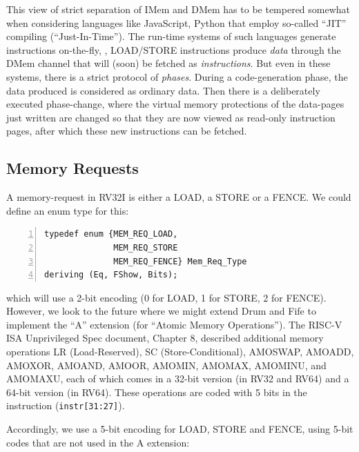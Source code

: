 
This view of strict separation of IMem and DMem has to be tempered
somewhat when considering languages like JavaScript, Python {\etc}
that employ so-called ``JIT'' compiling (``Just-In-Time'').  The
run-time systems of such languages generate instructions on-the-fly,
{\ie}, LOAD/STORE instructions produce \emph{data} through the DMem
channel that will (soon) be fetched as \emph{instructions}.  But even
in these systems, there is a strict protocol of \emph{phases}.  During
a code-generation phase, the data produced is considered as ordinary
data.  Then there is a deliberately executed phase-change, where the
virtual memory protections of the data-pages just written are changed
so that they are now viewed as read-only instruction pages, after
which these new instructions can be fetched.


\subsection{Memory Requests}

\label{Sec_Mem_Req}


A memory-request in RV32I is either a LOAD, a STORE or a FENCE.  We
could define an enum type for this:

{\footnotesize
\begin{Verbatim}[frame=single, numbers=left]
typedef enum {MEM_REQ_LOAD,
              MEM_REQ_STORE
              MEM_REQ_FENCE} Mem_Req_Type
deriving (Eq, FShow, Bits);
\end{Verbatim}
}

which will use a 2-bit encoding (0 for LOAD, 1 for STORE, 2 for
FENCE).  However, we look to the future where we might extend Drum and
Fife to implement the ``A'' extension (for ``Atomic Memory
Operations'').  The RISC-V ISA Unprivileged Spec document, Chapter 8,
described additional memory operations LR (Load-Reserved), SC
(Store-Conditional), AMOSWAP, AMOADD, AMOXOR, AMOAND, AMOOR, AMOMIN,
AMOMAX, AMOMINU, and AMOMAXU, each of which comes in a 32-bit version
(in RV32 and RV64) and a 64-bit version (in RV64).  These operations
are coded with 5 bits in the instruction (\verb|instr[31:27]|).

Accordingly, we use a 5-bit encoding for LOAD, STORE and FENCE, using
5-bit codes that are not used in the A extension:

